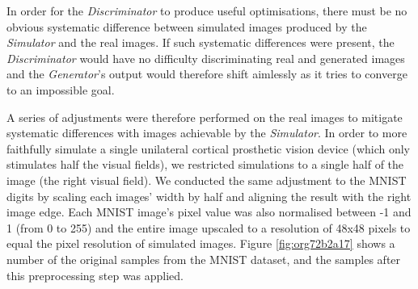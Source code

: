 \documentclass[a4paper,11pt,openany]{book}
\begin{document}
In order for the \emph{Discriminator} to produce useful optimisations, there must be no obvious systematic difference between simulated images produced by the \emph{Simulator} and the real images.
If such systematic differences were present, the \emph{Discriminator} would have no difficulty discriminating real and generated images and the \emph{Generator}'s output would therefore shift aimlessly as it tries to converge to an impossible goal.

A series of adjustments were therefore performed on the real images to mitigate systematic differences with images achievable by the \emph{Simulator}.
In order to more faithfully simulate a single unilateral cortical prosthetic vision device (which only stimulates half the visual fields), we restricted simulations to a single half of the image (the right visual field).
We conducted the same adjustment to the MNIST digits by scaling each images' width by half and aligning the result with the right image edge.
Each MNIST image's pixel value was also normalised between -1 and 1 (from 0 to 255) and the entire image upscaled to a resolution of 48x48 pixels to equal the pixel resolution of simulated images.
Figure \ref{fig:org72b2a17} shows a number of the original samples from the MNIST dataset, and the samples after this preprocessing step was applied.
\end{document}
